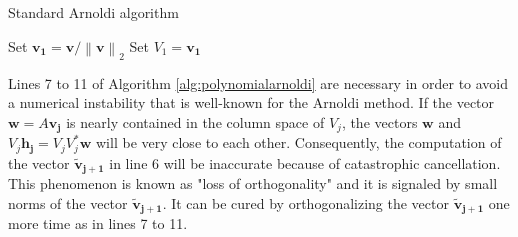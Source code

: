 \begin{algorithm}[ht!]
    \caption{Standard Arnoldi algorithm}
    \label{alg:polynomialarnoldi}
    Set $\mathbf{v_1} = \mathbf{v} / \left\| \mathbf{v} \right\|_2$\;
    Set $V_1 = \mathbf{v_1}$\;
\end{algorithm}

\begin{remark}
    Lines 7 to 11 of Algorithm \ref{alg:polynomialarnoldi} are necessary in order to avoid a
    numerical instability that is well-known for the Arnoldi method.
    If the vector $\mathbf{w} = A \mathbf{v_j}$ is nearly contained in the column
    space of $V_j$, the vectors $\mathbf{w}$ and $V_j \mathbf{h_j} = V_j V_j^* \mathbf{w}$
    will be very close to each other. Consequently, the computation of the vector
    $\mathbf{\tilde{v}_{j+1}}$ in line 6 will be inaccurate because of catastrophic
    cancellation.
    This phenomenon is known as "loss of orthogonality" and it is signaled by
    small norms of the vector $\mathbf{\tilde{v}_{j+1}}$. It can be cured by
    orthogonalizing the vector $\mathbf{\tilde{v}_{j+1}}$ one more time as in lines 7 to 11.
\end{remark}

